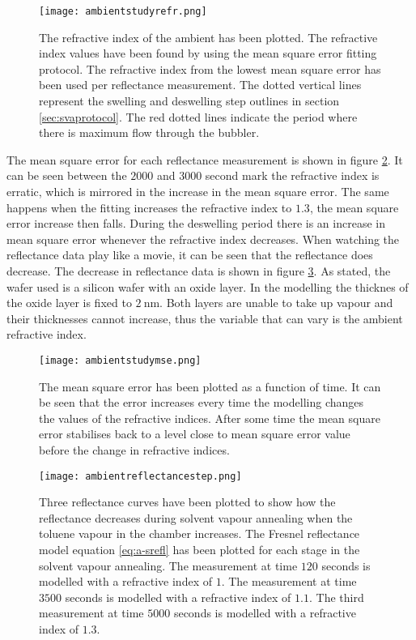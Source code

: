 \documentclass[MasterThesisMain.tex]{subfiles}
\begin{document}
\begin{figure}
\centering
\texttt{[image: ambientstudyrefr.png]}
\caption{The refractive index of the ambient has been plotted. The refractive index values have been found by using the mean square error fitting protocol. The refractive index from the lowest mean square error has been used per reflectance measurement. The dotted vertical lines represent the swelling and deswelling step outlines in section \ref{sec:svaprotocol}. The red dotted lines indicate the period where there is maximum flow through the bubbler.}
\label{fig:ambientrefr}
\end{figure}

The mean square error for each reflectance measurement is shown in figure \ref{fig:ambientmse}. It can be seen between the $2000$ and $3000$ second mark the refractive index is erratic, which is mirrored in the increase in the mean square error. The same happens when the fitting increases the refractive index to $1.3$, the mean square error increase then falls. During the deswelling period there is an increase in mean square error whenever the refractive index decreases. When watching the reflectance data play like a movie, it can be seen that the reflectance does decrease. The decrease in reflectance data is shown in figure \ref{fig:ambientreflectance}. As stated, the wafer used is a silicon wafer with an oxide layer. In the modelling the thicknes of the oxide layer is fixed to $\SI{2}{\nano\meter}$. Both layers are unable to take up vapour and their thicknesses cannot increase, thus the variable that can vary is the ambient refractive index.

\begin{figure}
\centering
\texttt{[image: ambientstudymse.png]}
\caption{The mean square error has been plotted as a function of time. It can be seen that the error increases every time the modelling changes the values of the refractive indices. After some time the mean square error stabilises back to a level close to mean square error value before the change in refractive indices.}
\label{fig:ambientmse}
\end{figure}

\begin{figure}
\centering
\texttt{[image: ambientreflectancestep.png]}
\caption{Three reflectance curves have been plotted to show how the reflectance decreases during solvent vapour annealing when the toluene vapour in the chamber increases. The Fresnel reflectance model equation \ref{eq:a-srefl} has been plotted for each stage in the solvent vapour annealing. The measurement at time $120$ seconds is modelled with a refractive index of $1$. The measurement at time $3500$ seconds is modelled with a refractive index of $1.1$. The third measurement at time $5000$ seconds is modelled with a refractive index of $1.3$.}
\label{fig:ambientreflectance}
\end{figure}
\end{document}
